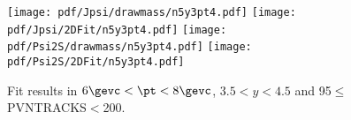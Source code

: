\begin{figure}[H]
\begin{center}
\texttt{[image: pdf/Jpsi/drawmass/n5y3pt4.pdf]}
\texttt{[image: pdf/Jpsi/2DFit/n5y3pt4.pdf]}
\vspace*{-0.5cm}
\texttt{[image: pdf/Psi2S/drawmass/n5y3pt4.pdf]}
\texttt{[image: pdf/Psi2S/2DFit/n5y3pt4.pdf]}
\vspace*{-0.5cm}
\end{center}
\caption{Fit results in $6\gevc<\pt<8\gevc$, $3.5<y<4.5$ and 95$\leq$PVNTRACKS$<$200.}
\label{Fitn5y3pt4}
\end{figure}
